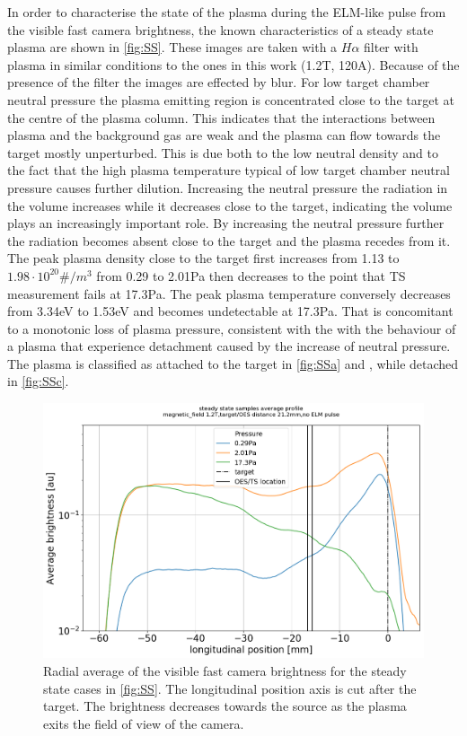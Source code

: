 In order to characterise the state of the plasma during the ELM-like pulse from the visible fast camera brightness, the known characteristics of a steady state plasma are shown in \autoref{fig:SS}. \cite{Akkermans2020,Perillo2019}
These images are taken with a $H\alpha$ filter with plasma in similar conditions to the ones in this work (1.2T, 120A). Because of the presence of the filter the images are effected by blur.
For low target chamber neutral pressure the plasma emitting region is concentrated close to the target at the centre of the plasma column. This indicates that the interactions between plasma and the background gas are weak and the plasma can flow towards the target mostly unperturbed. This is due both to the low neutral density and to the fact that the high plasma temperature typical of low target chamber neutral pressure causes further dilution. \cite{DenHarder2015} Increasing the neutral pressure the radiation in the volume increases while it decreases close to the target, indicating the volume plays an increasingly important role. By increasing the neutral pressure further the radiation becomes absent close to the target and the plasma recedes from it. The peak plasma density close to the target first increases from 1.13 to $1.98 \cdot 10^{20}\#/m^3$ from 0.29 to 2.01Pa then decreases to the point that TS measurement fails at 17.3Pa. The peak plasma temperature conversely decreases from 3.34eV to 1.53eV and becomes undetectable at 17.3Pa. That is concomitant to a monotonic loss of plasma pressure, consistent with the with the behaviour of a plasma that experience detachment caused by the increase of neutral pressure.\cite{Perillo2019} The plasma is classified as attached to the target in \autoref{fig:SSa} and , while detached in \autoref{fig:SSc}.

\begin{figure}
	\centering
	\includegraphics[width=0.7\linewidth,trim={7 0 9 45},clip]{Chapters/chapter3/figs/SS_scan4.png}
	\caption{Radial average of the visible fast camera brightness for the steady state cases in \autoref{fig:SS}. The longitudinal position axis is cut after the target. The brightness decreases towards the source as the plasma exits the field of view of the camera.}
	\label{fig:SS2}
\end{figure}

